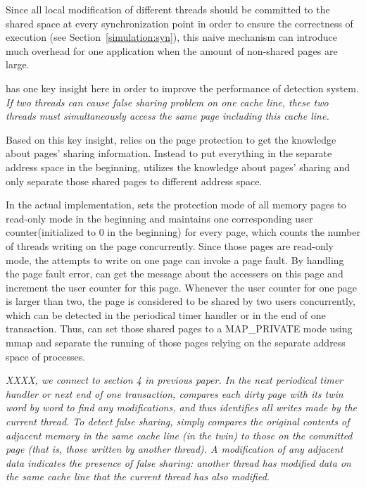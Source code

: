 Since all local modification of different threads should be committed to the shared space 
at every synchronization point in order to ensure the correctness of execution (see Section~\ref{simulation:syn}),
this naive mechanism can introduce much overhead for one application when the amount of non-shared pages are large.

\sheriff{} has one key insight here in order to improve the performance of detection system. 
\em{If two threads can cause false sharing problem on one cache line, these two threads must 
simultaneously access the same page including this cache line}. 

Based on this key insight, \sheriff{} relies on the page protection to get the knowledge about pages' sharing information.
Instead to put everything in the separate address space in the beginning, 
\sheriff{} utilizes the knowledge about pages' sharing and only separate those shared pages to different address space.
 
In the actual implementation, \sheriff{} sets the protection mode of all memory pages
to read-only mode in the beginning and maintains one corresponding user counter(initialized to 0 in the beginning) 
for every page, which counts the number of threads writing on the page concurrently. 
Since those pages are read-only mode, the attempts to write on one page can invoke a page fault. By handling the page fault error,
\sheriff{} can get the message about the accessers on this page and increment the user counter for this page.
Whenever the user counter for one page is larger than two, the page is considered to be shared by two users concurrently,
which can be detected in the periodical timer handler or in the end of one transaction. 
Thus, \sheriff{} can set those shared pages to a MAP\_PRIVATE mode using mmap and separate the running of those pages relying on the separate address space of processes. 

\em{XXXX, we connect to section 4 in previous paper.}
In the next periodical timer handler or next end of one transaction, \sheriff{} compares each dirty page
with its twin word by word to find any modifications, and thus
identifies all writes made by the current thread. To detect false
sharing, \sheriff{} simply compares the original contents of adjacent
memory in the same cache line (in the twin) to those on the committed
page (that is, those written by another thread). A modification of any
adjacent data indicates the presence of false sharing: another thread
has modified data on the same cache line that the current thread has
also modified.

